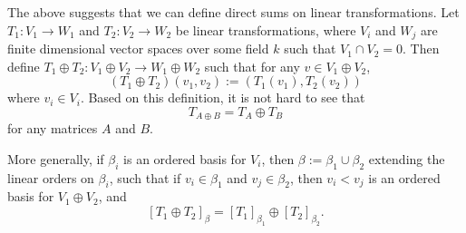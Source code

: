 \documentclass[12pt]{article}
\begin{document}
The above suggests that we can define direct sums on linear transformations.  Let $T_1:V_1\to W_1$ and $T_2:V_2\to W_2$ be linear transformations, where $V_i$ and $W_j$ are finite dimensional vector spaces over some field $k$ such that $V_1\cap V_2=0$.  Then define $T_1\oplus T_2: V_1\oplus V_2 \to W_1\oplus W_2$ such that for any $v\in V_1\oplus V_2$, $$(T_1\oplus T_2)(v_1,v_2):=(T_1(v_1),T_2(v_2))$$ where $v_i\in V_i$.
Based on this definition, it is not hard to see that $$T_{A\oplus B}=T_A \oplus T_B$$ for any matrices $A$ and $B$.

More generally, if $\beta_i$ is an ordered basis for $V_i$, then $\beta:=\beta_1\cup \beta_2$ extending the linear orders on $\beta_i$, such that if $v_i\in \beta_1$ and $v_j\in \beta_2$, then $v_i<v_j$ is an ordered basis for $V_1\oplus V_2$, and $$[T_1\oplus T_2]_{\beta}=[T_1]_{\beta_1}\oplus [T_2]_{\beta_2}.$$
\end{document}
